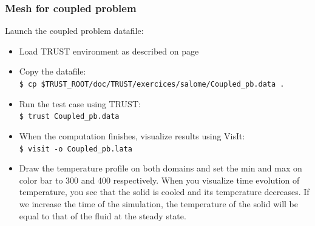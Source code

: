\documentclass[10pt, hyperref={unicode=true,pdfusetitle, bookmarks=true,bookmarksnumbered=false,bookmarksopen=false, breaklinks=false,pdfborder={0 0l 1},backref=true,colorlinks=true,linkcolor=darkblue,pageanchor}]{beamer}
\begin{document}
\begin{frame}
\frametitle{Mesh for coupled problem}

\begin{block}{Launch the coupled problem datafile:}
\begin{itemize} 

 \item Load TRUST environment as described on page \pageref{init_trust}

 \item Copy the datafile: \\
 \texttt{\$ cp \$TRUST\_ROOT/doc/TRUST/exercices/salome/Coupled\_pb.data .}

 \item Run the test case using TRUST: \\
 \texttt{\$ trust Coupled\_pb.data}

 \item When the computation finishes, visualize results using VisIt:\\
 \texttt{\$ visit -o Coupled\_pb.lata}

 \item Draw the temperature profile on both domains and set the min and max on color bar to 300 and 400 respectively. When you visualize time evolution of temperature, you see that the solid is cooled and its temperature decreases. If we increase the time of the simulation, the temperature of the solid will be equal to that of the fluid at the steady state.
 
\end{itemize}
\end{block}

\end{frame}
\end{document}
